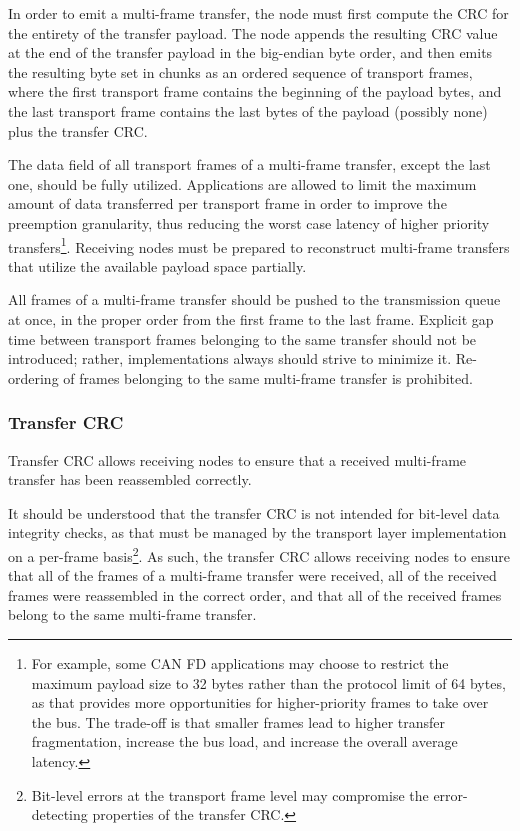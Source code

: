In order to emit a multi-frame transfer, the node must first compute the CRC for the entirety of the transfer payload.
The node appends the resulting CRC value at the end of the transfer payload in the big-endian byte order,
and then emits the resulting byte set in chunks as an ordered sequence of transport frames,
where the first transport frame contains the beginning of the payload bytes,
and the last transport frame contains the last bytes of the payload (possibly none) plus the transfer CRC.

The data field of all transport frames of a multi-frame transfer, except the last one, should be fully utilized.
Applications are allowed to limit the maximum amount of data transferred per transport frame in order to
improve the preemption granularity, thus reducing the worst case latency of higher priority
transfers\footnote{For example, some CAN FD applications may choose to restrict the maximum payload size to 32 bytes
rather than the protocol limit of 64 bytes, as that provides more opportunities for higher-priority frames to
take over the bus. The trade-off is that smaller frames lead to higher transfer fragmentation, increase the bus load,
and increase the overall average latency.}.
Receiving nodes must be prepared to reconstruct multi-frame transfers that utilize the
available payload space partially.

All frames of a multi-frame transfer should be pushed to the transmission queue at once,
in the proper order from the first frame to the last frame.
Explicit gap time between transport frames belonging to the same transfer should not be introduced;
rather, implementations always should strive to minimize it.
Re-ordering of frames belonging to the same multi-frame transfer is prohibited.

\subsubsection{Transfer CRC}\label{sec:transfer_crc}

Transfer CRC allows receiving nodes to ensure that a received multi-frame transfer has been reassembled correctly.

It should be understood that the transfer CRC is not intended for bit-level data integrity checks,
as that must be managed by the transport layer implementation on a per-frame
basis\footnote{Bit-level errors at the transport frame level may compromise the error-detecting
properties of the transfer CRC.}.
As such, the transfer CRC allows receiving nodes to ensure that all of the frames of a multi-frame
transfer were received, all of the received frames were reassembled in the correct order,
and that all of the received frames belong to the same multi-frame transfer.

